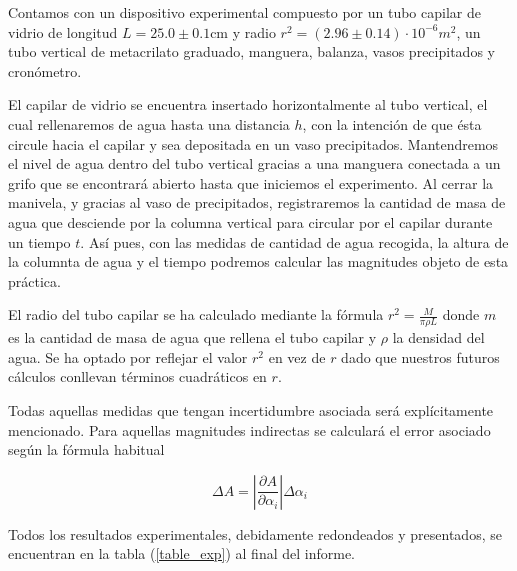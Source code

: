 Contamos con un dispositivo experimental compuesto por un tubo capilar de vidrio de longitud $ L = 25.0 \pm 0.1$cm y radio $r^2 = (2.96 \pm 0.14)\cdot 10^{-6}m^2$, un tubo vertical de metacrilato graduado, manguera, balanza, vasos precipitados y cronómetro.

El capilar de vidrio se encuentra insertado horizontalmente al tubo vertical, el cual rellenaremos de agua hasta una distancia $h$, con la intención de que ésta circule hacia el capilar y sea depositada en un vaso precipitados. Mantendremos el nivel de agua dentro del tubo vertical gracias a una manguera conectada a un grifo que se encontrará abierto hasta que iniciemos el experimento. Al cerrar la manivela, y gracias al vaso de precipitados, registraremos la cantidad de masa de agua que desciende por la columna vertical para circular por el capilar durante un tiempo $t$. Así pues, con las medidas de cantidad de agua recogida, la altura de la columnta de agua y el tiempo podremos calcular las magnitudes objeto de esta práctica.

El radio del tubo capilar se ha calculado mediante la fórmula $r^2 = \frac{M}{\pi \rho L}$ donde $m$ es la cantidad de masa de agua que rellena el tubo capilar y $\rho$ la densidad del agua. Se ha optado por reflejar el valor $r^2$ en vez de $r$ dado que nuestros futuros cálculos conllevan términos cuadráticos en $r$.

Todas aquellas medidas que tengan incertidumbre asociada será explícitamente mencionado. Para aquellas magnitudes indirectas se calculará el error asociado según la fórmula habitual

\begin{equation}
	\Delta{A} = |\frac{\partial A}{\partial \alpha_i}|\Delta \alpha_i
\end{equation}

Todos los resultados experimentales, debidamente redondeados y presentados, se encuentran en la tabla (\ref{table_exp}) al final del informe.